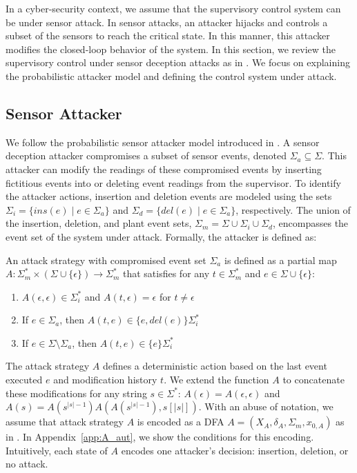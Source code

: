 In a cyber-security context, we assume that the supervisory control system can be under sensor attack.
In sensor attacks, an attacker hijacks and controls a subset of the sensors to reach the critical state.
In this manner, this attacker modifies the closed-loop behavior of the system.
In this section, we review the supervisory control under sensor deception attacks as in \citep{Su:2018,meira-goes:2020synthesis,meira-goes:2023dealing}.
We focus on explaining the probabilistic attacker model and defining the control system under attack.

\subsection{Sensor Attacker} 
We follow the probabilistic sensor attacker model introduced in \citep{meira-goes:2021synthesis}.
A sensor deception attacker compromises a subset of sensor events, denoted $\Sigma_a\subseteq \Sigma$.
This attacker can modify the readings of these compromised events by inserting fictitious events into or deleting event readings from the supervisor.
To identify the attacker actions, insertion and deletion events are modeled using the sets $\Sigma_i = \{ins(e) \mid e \in \Sigma_a\}$ and $\Sigma_d=\{del(e)\mid e \in \Sigma_a\}$, respectively.
The union of the insertion, deletion, and plant event sets, $\Sigma_m = \Sigma\cup\Sigma_i\cup\Sigma_d$, encompasses the event set of the system under attack. 
Formally, the attacker is defined as:

\begin{definition}\label{def:attack_str}
An attack strategy with compromised event set $\Sigma_a$ is defined as a partial map $A: \Sigma_m^* \times (\Sigma\cup \{\epsilon\})\rightarrow \Sigma_m^*$ that satisfies for any $t \in \Sigma^*_m$ and $e \in \Sigma\cup \{\epsilon\}$:
\begin{enumerate}
    \item $A(\epsilon,\epsilon) \in \Sigma_{i}^*$ and $A(t,\epsilon) = \epsilon$ for $t\neq \epsilon$
    \item If $e\in \Sigma_a$, then $A(t,e)\in \{e,del(e)\}\Sigma_i^*$
    \item If $e\in \Sigma\setminus\Sigma_a$, then $A(t,e)\in \{e\}\Sigma_i^*$
\end{enumerate}
\end{definition}
The attack strategy $A$ defines a deterministic action based on the last event executed $e$ and modification history $t$.
We extend the function $A$ to concatenate these modifications for any string $s\in \Sigma^*$: $A(\epsilon) = A(\epsilon,\epsilon)$ and $A(s) = A(s^{|s|-1})A(A(s^{|s|-1}),s[|s|])$.
With an abuse of notation, we assume that attack strategy $A$ is encoded as a DFA $A = (X_A, \delta_A, \Sigma_m, x_{0,A})$ as in \citep{meira-goes:2020synthesis,meira-goes2021synthesistac}.
In Appendix~\ref{app:A_aut}, we show the conditions for this encoding.
Intuitively, each state of $A$ encodes one attacker's decision: insertion, deletion, or no attack. 

